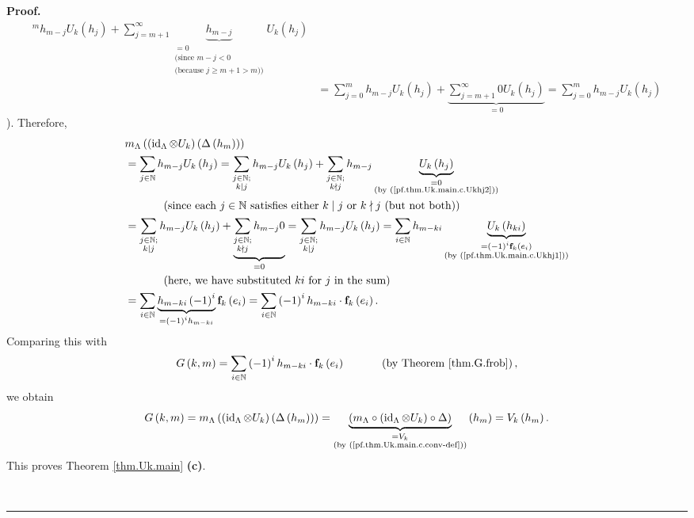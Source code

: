 \documentclass[numbers=enddot,12pt,final,onecolumn,notitlepage]{scrartcl}%
\theoremstyle{definition}
\newenvironment{proof}[1][Proof]{\noindent\textbf{#1.} }{\ \rule{0.5em}{0.5em}}
\let\sumnonlimits\sum
\renewcommand{\sum}{\sumnonlimits\limits}
\newenvironment{verlong}{}{}
\begin{document}
\begin{proof}
\begin{verlong}
\begin{align*}
^{m}h_{m-j}U_{k}\left(  h_{j}\right)  +\sum_{j=m+1}^{\infty}%
\underbrace{h_{m-j}}_{\substack{=0\\\text{(since }m-j<0\\\text{(because }j\geq
m+1>m\text{))}}}U_{k}\left(  h_{j}\right) \\
&  =\sum_{j=0}^{m}h_{m-j}U_{k}\left(  h_{j}\right)  +\underbrace{\sum
_{j=m+1}^{\infty}0U_{k}\left(  h_{j}\right)  }_{=0}=\sum_{j=0}^{m}h_{m-j}%
U_{k}\left(  h_{j}\right)
\end{align*}
). Therefore,%
\begin{align*}
&  m_{\Lambda}\left(  \left(  \operatorname*{id}\nolimits_{\Lambda}\otimes
U_{k}\right)  \left(  \Delta\left(  h_{m}\right)  \right)  \right) \\
&  =\sum_{j\in\mathbb{N}}h_{m-j}U_{k}\left(  h_{j}\right)  =\sum
_{\substack{j\in\mathbb{N};\\k\mid j}}h_{m-j}U_{k}\left(  h_{j}\right)
+\sum_{\substack{j\in\mathbb{N};\\k\nmid j}}h_{m-j}\underbrace{U_{k}\left(
h_{j}\right)  }_{\substack{=0\\\text{(by (\ref{pf.thm.Uk.main.c.Ukhj2}))}}}\\
&  \ \ \ \ \ \ \ \ \ \ \left(  \text{since each }j\in\mathbb{N}\text{
satisfies either }k\mid j\text{ or }k\nmid j\text{ (but not both)}\right) \\
&  =\sum_{\substack{j\in\mathbb{N};\\k\mid j}}h_{m-j}U_{k}\left(
h_{j}\right)  +\underbrace{\sum_{\substack{j\in\mathbb{N};\\k\nmid j}%
}h_{m-j}0}_{=0}=\sum_{\substack{j\in\mathbb{N};\\k\mid j}}h_{m-j}U_{k}\left(
h_{j}\right)  =\sum_{i\in\mathbb{N}}h_{m-ki}\underbrace{U_{k}\left(
h_{ki}\right)  }_{\substack{=\left(  -1\right)  ^{i}\mathbf{f}_{k}\left(
e_{i}\right)  \\\text{(by (\ref{pf.thm.Uk.main.c.Ukhj1}))}}}\\
&  \ \ \ \ \ \ \ \ \ \ \left(  \text{here, we have substituted }ki\text{ for
}j\text{ in the sum}\right) \\
&  =\sum_{i\in\mathbb{N}}\underbrace{h_{m-ki}\left(  -1\right)  ^{i}%
}_{=\left(  -1\right)  ^{i}h_{m-ki}}\mathbf{f}_{k}\left(  e_{i}\right)
=\sum_{i\in\mathbb{N}}\left(  -1\right)  ^{i}h_{m-ki}\cdot\mathbf{f}%
_{k}\left(  e_{i}\right)  .
\end{align*}
Comparing this with%
\[
G\left(  k,m\right)  =\sum_{i\in\mathbb{N}}\left(  -1\right)  ^{i}%
h_{m-ki}\cdot\mathbf{f}_{k}\left(  e_{i}\right)  \ \ \ \ \ \ \ \ \ \ \left(
\text{by Theorem \ref{thm.G.frob}}\right)  ,
\]
we obtain%
\[
G\left(  k,m\right)  =m_{\Lambda}\left(  \left(  \operatorname*{id}%
\nolimits_{\Lambda}\otimes U_{k}\right)  \left(  \Delta\left(  h_{m}\right)
\right)  \right)  =\underbrace{\left(  m_{\Lambda}\circ\left(
\operatorname*{id}\nolimits_{\Lambda}\otimes U_{k}\right)  \circ\Delta\right)
}_{\substack{=V_{k}\\\text{(by (\ref{pf.thm.Uk.main.c.conv-def}))}}}\left(
h_{m}\right)  =V_{k}\left(  h_{m}\right)  .
\]
This proves Theorem \ref{thm.Uk.main} \textbf{(c)}.
\end{verlong}


\end{proof}
\end{document}
